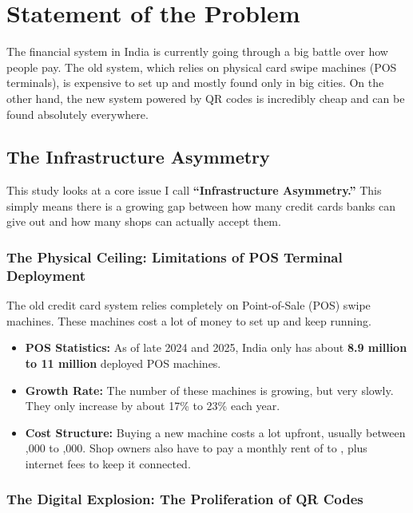 \chapter{Statement of the Problem}

The financial system in India is currently going through a big battle over how people pay. The old system, which relies on physical card swipe machines (POS terminals), is expensive to set up and mostly found only in big cities. On the other hand, the new system powered by QR codes is incredibly cheap and can be found absolutely everywhere.

\section{The Infrastructure Asymmetry}

This study looks at a core issue I call \textbf{``Infrastructure Asymmetry.''} This simply means there is a growing gap between how many credit cards banks can give out and how many shops can actually accept them.

\subsection{The Physical Ceiling: Limitations of POS Terminal Deployment}

The old credit card system relies completely on Point-of-Sale (POS) swipe machines. These machines cost a lot of money to set up and keep running.

\begin{itemize}
    \item \textbf{POS Statistics:} As of late 2024 and 2025, India only has about \textbf{8.9 million to 11 million} deployed POS machines.
    \item \textbf{Growth Rate:} The number of these machines is growing, but very slowly. They only increase by about 17\% to 23\% each year.
    \item \textbf{Cost Structure:} Buying a new machine costs a lot upfront, usually between ,000 to ,000. Shop owners also have to pay a monthly rent of  to , plus internet fees to keep it connected.
\end{itemize}

\subsection{The Digital Explosion: The Proliferation of QR Codes}

